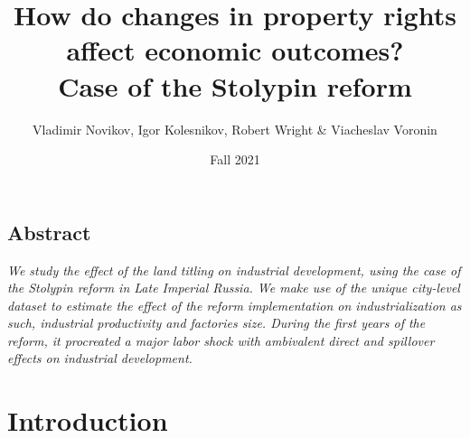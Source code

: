 \documentclass[a4paper, 12pt]{article}
\title{%
How do changes in property rights affect economic outcomes?\\
\Large Case of the Stolypin reform}
\author{Vladimir Novikov, Igor Kolesnikov, Robert Wright \& Viacheslav Voronin}
\date{Fall 2021}
\begin{document}
\maketitle

\subsection*{Abstract}

\textit{We study the effect of the land titling on industrial development, using the case of the Stolypin reform in Late Imperial Russia. We make use of the unique city-level dataset to estimate the effect of the reform implementation on industrialization as such, industrial productivity and factories size. During the first years of the reform, it procreated a major labor shock with ambivalent direct and spillover effects on industrial development.}

\newpage

\section{Introduction}
\end{document}
